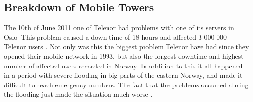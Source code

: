 \subsection{Breakdown of Mobile Towers}

The 10th of June 2011 one of Telenor had problems with one of its servers in Oslo. This problem caused a down time of 18 hours and affected 3 000 000 Telenor users \cite{listeNedetid}. Not only was this the biggest problem Telenor have had since they opened their mobile network in 1993, but also the longest downtime and highest number of affected users recorded in Norway. In addition to this it all happened in a period with severe flooding in big parts of the eastern Norway, and made it difficult to reach emergency numbers. The fact that the problems occurred during the flooding just made the situation much worse \cite{TelenorNede}.
